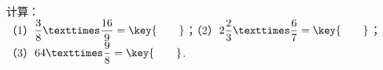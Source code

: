 计算：\\
（1）$\dfrac{3}{8}×\dfrac{16}{9}=\key{\qquad}$；（2）$2\dfrac{2}{3}×\dfrac{6}{7}=\key{\qquad}$；
（3）$64×\dfrac{9}{8}=\key{\qquad}$.